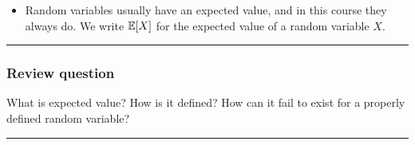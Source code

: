 \documentclass[]{article}
\providecommand{\tightlist}{%
  \setlength{\itemsep}{0pt}\setlength{\parskip}{0pt}}
\begin{document}
\begin{itemize}
\tightlist
\item
  Random variables usually have an expected value, and in this course
  they always do. We write \(\mathbb{E}[X]\) for the expected value of a random
  variable \(X\).
\end{itemize}

\begin{center}\rule{0.5\linewidth}{\linethickness}\end{center}

\subsubsection{Review question}\label{review-question}

What is expected value? How is it defined? How can it fail to exist for
a properly defined random variable?

\begin{center}\rule{0.5\linewidth}{\linethickness}\end{center}
\end{document}

